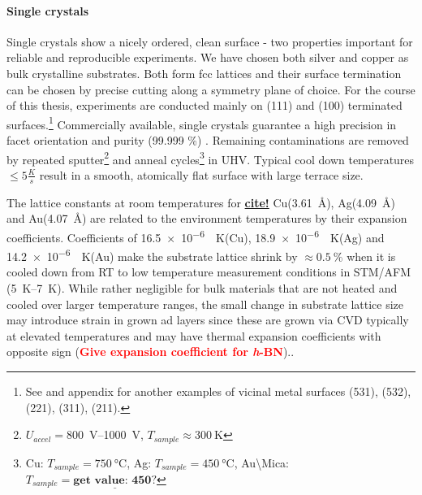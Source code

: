 \paragraph{Single crystals}
Single crystals show a nicely ordered, clean surface - two properties important for reliable and reproducible experiments. We have chosen both silver and copper as bulk crystalline substrates. Both form fcc lattices and their surface termination can be chosen by precise cutting along a symmetry plane of choice. For the course of this thesis, experiments are conducted mainly on (111) and (100) terminated surfaces.\footnote{See \cite{riemann_ionic_2002} and appendix  for another examples of vicinal metal surfaces (531), (532), (221), (311), (211).} Commercially available, single crystals guarantee a high precision in facet orientation and purity (99.999 \%) \cite{mateck}. 
Remaining contaminations 
are removed by repeated sputter\footnote{$U_{accel}=$\SIrange{800}{1000}{\volt}, $T_{sample}\approx \SI{300}{\kelvin}$} and anneal cycles\footnote{Cu: $T_{sample}=\SI{750}{\celsius}$, Ag: $T_{sample}=\SI{450}{\celsius}$, Au\textbackslash Mica: $T_{sample}= \underline{\textbf{get value: 450?}}$} in UHV. Typical cool down temperatures $\leq 5 \frac{K}{s}$ result in a smooth, atomically flat surface with large terrace size. 

The lattice constants at room temperatures for \underline{\textbf{cite!}} Cu(\SI{3,61}{\angstrom}), Ag(\SI{4,09}{\angstrom}) and Au(\SI{4,07}{\angstrom}) are related to the environment temperatures by their expansion coefficients.
Coefficients of \SI{16,5e-6}{\per \kelvin}(Cu), \SI{18,9e-6}{\per \kelvin}(Ag) and \SI{14,2e-6}{\per \kelvin}(Au) make the substrate lattice shrink by $\approx \SI{0,5}{\percent}$ when it is cooled down from RT to low temperature measurement conditions in STM/AFM (\SIrange{5}{7}{\kelvin}). While rather negligible for bulk materials that are not heated and cooled over larger temperature ranges, the small change in substrate lattice size may introduce strain in grown ad layers since these are grown via CVD typically at elevated temperatures and may have thermal expansion coefficients with opposite sign (\textcolor{red}{\textbf{Give expansion coefficient for \textit{h}-BN}}).\cite{farwick_zum_hagen_structure_2016}.

